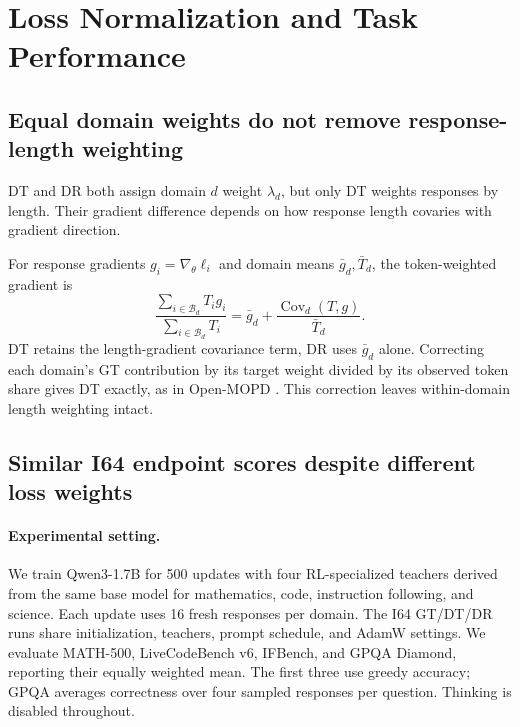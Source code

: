 \section{Loss Normalization and Task Performance}
\label{sec:normalization}

\subsection{Equal domain weights do not remove response-length weighting}

DT and DR both assign domain $d$ weight $\lambda_d$, but only DT weights responses by length. Their gradient difference depends on how response length covaries with gradient direction.

For response gradients $g_i=\nabla_\theta\ell_i$ and domain means $\bar g_d,\bar T_d$, the token-weighted gradient is
\begin{equation}
\frac{\sum_{i\in\mathcal B_d}T_i g_i}{\sum_{i\in\mathcal B_d}T_i}
=\bar g_d+\frac{\operatorname{Cov}_d(T,g)}{\bar T_d}.
\label{eq:weighting}
\end{equation}
DT retains the length-gradient covariance term, DR uses $\bar g_d$ alone. Correcting each domain's GT contribution by its target weight divided by its observed token share gives DT exactly, as in Open-MOPD \citep{gao2026openmopddiagnosingfixingcapability}. This correction leaves within-domain length weighting intact.

\subsection{Similar I64 endpoint scores despite different loss weights}

\paragraph{Experimental setting.}
We train Qwen3-1.7B for 500 updates with four RL-specialized teachers derived from the same base model for mathematics, code, instruction following, and science. Each update uses 16 fresh responses per domain. The I64 GT/DT/DR runs share initialization, teachers, prompt schedule, and AdamW settings. We evaluate MATH-500, LiveCodeBench v6, IFBench, and GPQA Diamond, reporting their equally weighted mean. The first three use greedy accuracy; GPQA averages correctness over four sampled responses per question. Thinking is disabled throughout.

